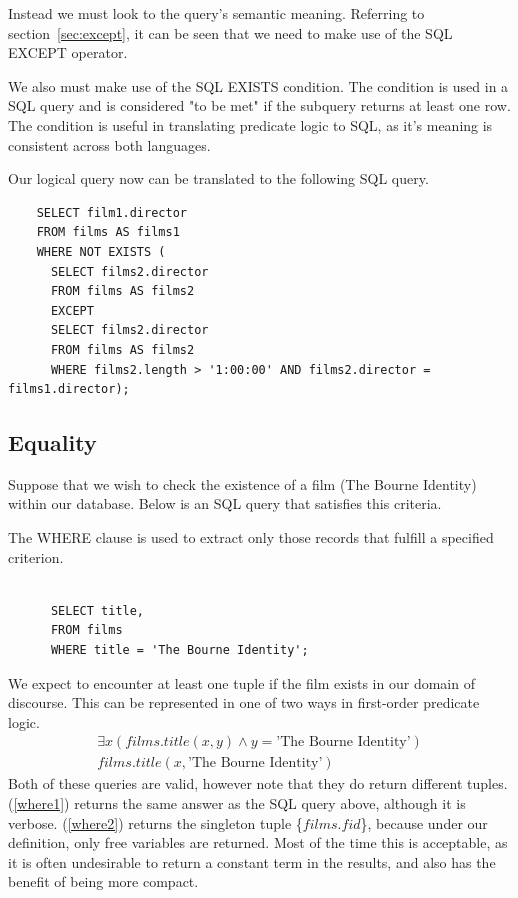 \documentclass[a4paper, 11pt]{article}
\begin{document}
    Instead we must look to the query's semantic meaning. Referring to
    section~\ref{sec:except}, it can be seen that we need to make use of the
    SQL EXCEPT operator.

    We also must make use of the SQL EXISTS condition. The condition
    is used in a SQL query and is considered "to be met" if the subquery
    returns at least one row.\cite{technetEXISTS} The condition is useful in
    translating predicate logic to SQL, as it's meaning is consistent across
    both languages. 

    Our logical query now can be translated to the following SQL query.
    \begin{verbatim}
    SELECT film1.director
    FROM films AS films1
    WHERE NOT EXISTS (
      SELECT films2.director
      FROM films AS films2
      EXCEPT
      SELECT films2.director
      FROM films AS films2
      WHERE films2.length > '1:00:00' AND films2.director = films1.director);
    \end{verbatim}

    \subsection{Equality}

      Suppose that we wish to check the existence of a film (The Bourne
      Identity) within our database. Below is an SQL query that satisfies this
      criteria.

      The WHERE clause is used to extract only those records that fulfill a
      specified criterion.~\cite{w3WHERE} 


      \begin{verbatim}

      SELECT title,
      FROM films
      WHERE title = 'The Bourne Identity';

      \end{verbatim}

      We expect to encounter at least one tuple if the film exists in our domain
      of discourse.  This can be represented
      in one of two ways in first-order predicate logic.
      \begin{gather}
        \exists x(films.title(x, y) \land y = \text{'The Bourne
        Identity'})\label{where1}\\
        films.title(x, \text{'The Bourne Identity'})\label{where2}
      \end{gather}
      Both of these queries are valid, however note that they do return different
      tuples. (\ref{where1}) returns the same answer as the SQL query above, although
      it is verbose. (\ref{where2}) returns the singleton tuple \{$films.fid$\},
      because under our definition, only free variables are returned. Most of
      the time this is acceptable, as it is often undesirable to return a
      constant term in the results, and also has the benefit of being more
      compact.
\end{document}
